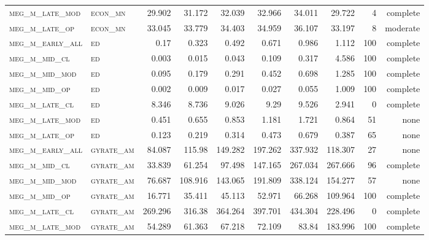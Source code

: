 \begin{landscape}
\begin{center}
\begin{footnotesize}
\begin{longtable}{llrrrrr|rrr}
\textsc{meg\_m\_late\_mod } & \textsc{econ\_mn  }   & 29.902   & 31.172   & 32.039   & 32.966   & 34.011   & 29.722   & 4   & complete \\
\textsc{meg\_m\_late\_op  } & \textsc{econ\_mn  }   & 33.045   & 33.779   & 34.403   & 34.959   & 36.107   & 33.197   & 8   & moderate \\
\textsc{meg\_m\_early\_all} & \textsc{ed        }   & 0.17     & 0.323    & 0.492    & 0.671    & 0.986    & 1.112    & 100 & complete \\
\textsc{meg\_m\_mid\_cl   } & \textsc{ed        }   & 0.003    & 0.015    & 0.043    & 0.109    & 0.317    & 4.586    & 100 & complete \\
\textsc{meg\_m\_mid\_mod  } & \textsc{ed        }   & 0.095    & 0.179    & 0.291    & 0.452    & 0.698    & 1.285    & 100 & complete \\
\textsc{meg\_m\_mid\_op   } & \textsc{ed        }   & 0.002    & 0.009    & 0.017    & 0.027    & 0.055    & 1.009    & 100 & complete \\
\textsc{meg\_m\_late\_cl  } & \textsc{ed        }   & 8.346    & 8.736    & 9.026    & 9.29     & 9.526    & 2.941    & 0   & complete \\
\textsc{meg\_m\_late\_mod } & \textsc{ed        }   & 0.451    & 0.655    & 0.853    & 1.181    & 1.721    & 0.864    & 51  & none     \\
\textsc{meg\_m\_late\_op  } & \textsc{ed        }   & 0.123    & 0.219    & 0.314    & 0.473    & 0.679    & 0.387    & 65  & none     \\
\textsc{meg\_m\_early\_all} & \textsc{gyrate\_am}   & 84.087   & 115.98   & 149.282  & 197.262  & 337.932  & 118.307  & 27  & none     \\
\textsc{meg\_m\_mid\_cl   } & \textsc{gyrate\_am}   & 33.839   & 61.254   & 97.498   & 147.165  & 267.034  & 267.666  & 96  & complete \\
\textsc{meg\_m\_mid\_mod  } & \textsc{gyrate\_am}   & 76.687   & 108.916  & 143.065  & 191.809  & 338.124  & 154.277  & 57  & none     \\
\textsc{meg\_m\_mid\_op   } & \textsc{gyrate\_am}   & 16.771   & 35.411   & 45.113   & 52.971   & 66.268   & 109.964  & 100 & complete \\
\textsc{meg\_m\_late\_cl  } & \textsc{gyrate\_am}   & 269.296  & 316.38   & 364.264  & 397.701  & 434.304  & 228.496  & 0   & complete \\
\textsc{meg\_m\_late\_mod } & \textsc{gyrate\_am}   & 54.289   & 61.363   & 67.218   & 72.109   & 83.84    & 183.996  & 100 & complete \\

\end{longtable}
\end{footnotesize}
\end{center}
\end{landscape}
